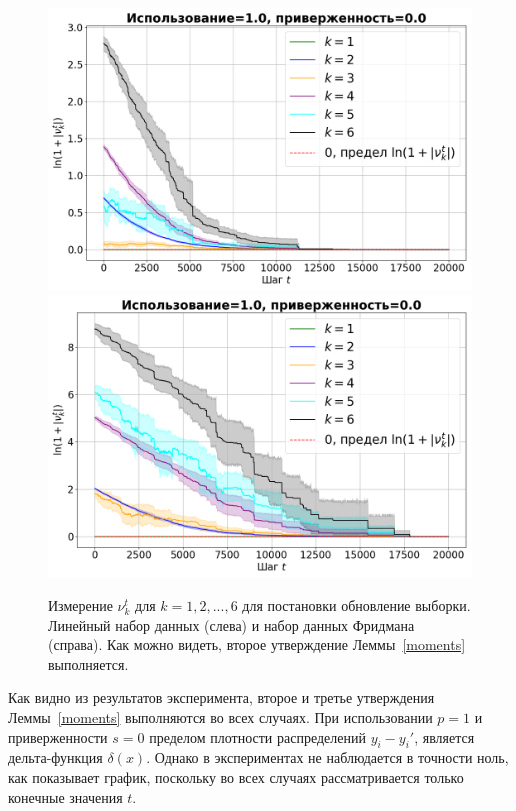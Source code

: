     \begin{figure}[h!]
        \centering
        \includegraphics[width=0.49\linewidth]{pictures/k_mom_su_synthetic_sgd_model_50_1.0_0.0.png}
        \includegraphics[width=0.49\linewidth]{pictures/k_mom_su_friedman_sgd_model_50_1.0_0.0.png}
        
        \caption{Измерение $\nu_k^t$ для $k = 1, 2, ... , 6$ для постановки обновление выборки. Линейный набор данных (слева) и набор данных Фридмана (справа). Как можно видеть, второе утверждение Леммы~\ref{moments} выполняется.}
        \label{fig_exp_5_2}
    \end{figure}

    \newpage

    Как видно из результатов эксперимента, второе и третье утверждения Леммы~\ref{moments} выполняются во всех случаях. При использовании $p = 1$ и приверженности $s = 0$ пределом плотности распределений $y_i - y_i'$, является дельта-функция $\delta(x)$. Однако в экспериментах не наблюдается в точности ноль, как показывает график, поскольку во всех случаях рассматривается только конечные значения $t$.


    

    






    




